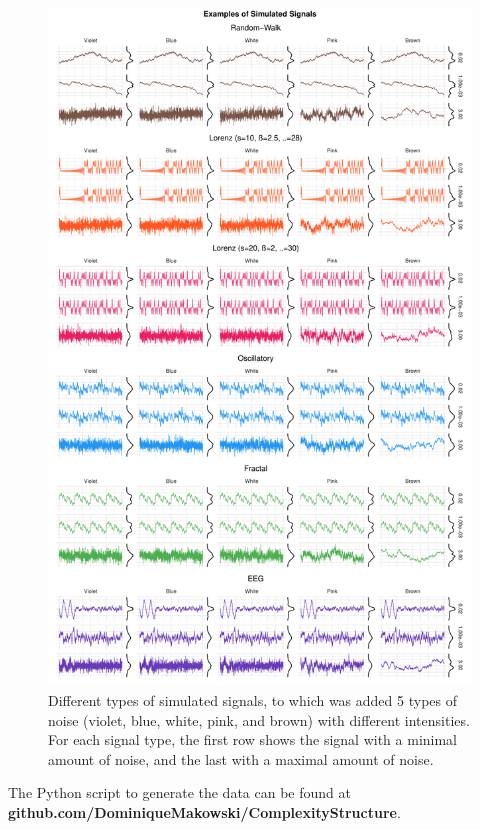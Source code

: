 \documentclass[
  man]{apa6}
\begin{document}
\begin{figure}
\centering
\includegraphics{./figures/signals-1.pdf}
\caption{\label{fig:signals}Different types of simulated signals, to which was added 5 types of noise (violet, blue, white, pink, and brown) with different intensities. For each signal type, the first row shows the signal with a minimal amount of noise, and the last with a maximal amount of noise.}
\end{figure}

The Python script to generate the data can be found at
\textbf{github.com/DominiqueMakowski/ComplexityStructure}.
\end{document}
